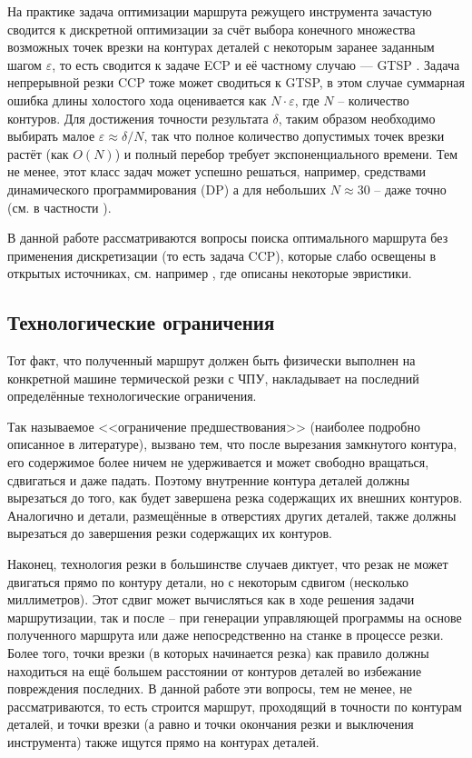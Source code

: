 \documentclass[10pt]{SPIIRAS_Proceedings}
\begin{document}
На практике задача оптимизации маршрута режущего инструмента
зачастую сводится к дискретной оптимизации
за счёт выбора конечного множества возможных точек врезки
на контурах деталей с некоторым заранее заданным шагом
$\varepsilon$,
то есть сводится к задаче ECP
\cite{bi04,bi05,bi06}
и её частному случаю ---
GTSP
\cite{bi07,bi08,bi09,bi10}.
Задача непрерывной резки CCP
тоже может сводиться к GTSP,
в этом случае суммарная ошибка длины
холостого хода оценивается как
$N \cdot \varepsilon$,
где $N$ -- количество контуров.
Для достижения точности результата
$\delta$,
таким образом необходимо выбирать малое
$\varepsilon \approx \delta / N$,
так что полное количество допустимых точек врезки растёт
(как $O (N)$)
и полный перебор требует экспоненциального времени.
Тем не менее, этот класс задач может успешно решаться,
например,
средствами динамического программирования
(DP)
а для небольших
$N \approx 30$ -- даже точно
(см. в частности \cite{bi15}).

В данной работе рассматриваются вопросы
поиска оптимального маршрута без
применения дискретизации
(то есть задача CCP),
которые слабо освещены в
открытых источниках,
см. например
\cite{bi11,bi12},
где описаны некоторые эвристики.

\subsection*{Технологические ограничения}

Тот факт, что полученный маршрут
должен быть физически выполнен
на конкретной машине термической резки с ЧПУ,
накладывает на последний определённые
технологические ограничения.

Так называемое <<ограничение предшествования>>
(наиболее подробно описанное в литературе),
вызвано тем,
что после вырезания замкнутого контура,
его содержимое более ничем не удерживается
и может свободно вращаться, сдвигаться и даже падать.
Поэтому внутренние контура деталей должны вырезаться до того,
как будет завершена резка содержащих их внешних контуров.
Аналогично и детали, размещённые в отверстиях
других деталей,
также должны вырезаться до завершения резки
содержащих их контуров.

Наконец, технология резки в большинстве случаев
диктует, что резак не может двигаться прямо по контуру детали,
но с некоторым сдвигом
(несколько миллиметров).
Этот сдвиг может вычисляться как в ходе
решения задачи маршрутизации,
так и после -- при генерации управляющей программы
на основе полученного маршрута или даже
непосредственно на станке в процессе резки.
Более того,
точки врезки
(в которых начинается резка)
как правило должны находиться
на ещё большем расстоянии от контуров деталей
во избежание повреждения последних.
В данной работе эти вопросы,
тем не менее,
не рассматриваются,
то есть строится маршрут,
проходящий в точности по контурам деталей,
и точки врезки
(а равно и точки окончания резки и выключения инструмента)
также ищутся прямо на контурах деталей.
\end{document}
